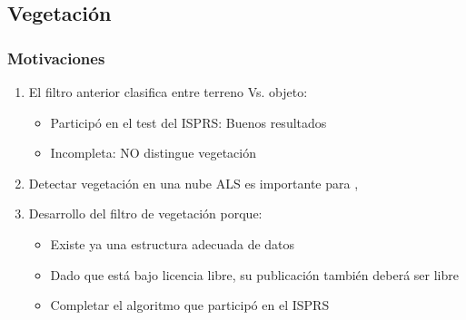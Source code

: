 \subsection{Vegetación}
\begin{frame}
  \frametitle{Motivaciones}
  \begin{enumerate}[<+->]
    \item El filtro anterior clasifica entre \alert{terreno} Vs. \alert{objeto}: 
  \begin{itemize}[<+->]
    \item Participó en el test del ISPRS: Buenos resultados
    \item Incompleta: \alert<3>{NO distingue vegetación}
  \end{itemize}
    \item Detectar vegetación en una nube ALS es importante para
      ,
       
    \item Desarrollo del filtro de vegetación porque:
    \begin{itemize}
    \item<7-> Existe ya una estructura adecuada de datos
    \item<7-> Dado que está bajo licencia libre, su publicación también deberá ser
      libre
    \item<7-> Completar el algoritmo que participó en el ISPRS
    \end{itemize}
  \end{enumerate}
\end{frame}
